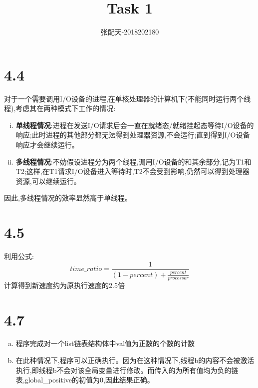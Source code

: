 \documentclass[UTF8]{ctexart}
\title{Task 1}
\author{张配天-2018202180}
\date{}
\begin{document}
    \maketitle
    \section*{4.4}
    对于一个需要调用I/O设备的进程,在单核处理器的计算机下(不能同时运行两个线程),考虑其在两种模式下工作的情况:
    \begin{enumerate}[i.]
        \item \textbf{单线程情况}:进程在发送I/O请求后会一直在就绪态/就绪挂起态等待I/O设备的响应;此时进程的其他部分都无法得到处理器资源,不会运行;直到得到I/O设备响应才会继续运行。
        \item \textbf{多线程情况}:不妨假设进程分为两个线程,调用I/O设备的和其余部分,记为T1和T2;这样,在T1请求I/O设备进入等待时,T2不会受到影响,仍然可以得到处理器资源,可以继续运行。
    \end{enumerate}
    \qquad 因此,多线程情况的效率显然高于单线程。

    \section*{4.5}
    利用公式:\\
    \begin{equation*}
        time\_ratio = \frac{1}{(1-percent) + \frac{percent}{processor}}
    \end{equation*}
    \qquad 计算得到新速度约为原执行速度的2.5倍

    \section*{4.7}
    \begin{enumerate}[a.]
        \item 程序完成对一个list链表结构体中val值为正数的个数的计数
        \item 在此种情况下,程序可以正确执行。因为在这种情况下,线程b的内容不会被激活执行,即线程b不会对该全局变量进行修改。而传入的为所有值均为负的链表,global\_positive的初值为0,因此结果正确。
    \end{enumerate}
    \clearpage
\end{document}
